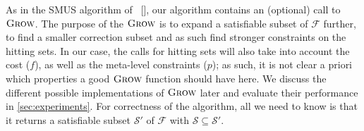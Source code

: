 \documentclass[twoside,11pt]{article}
\newcommand\citet[1]{\citeauthor{#1}~[\citeyear{#1}]}
\newcommand\m[1]{\mathcal{#1}}
\newcommand\comment[1]{\marginpar{\tiny #1}}
\renewcommand\comment[1]{#1}
\newcommand{\tias}[1]{{\comment{\color{blue}Tias:#1}}}
\newcommand{\bart}[1]{{\comment{\color{green}Bart: #1}}}
\newcommand\setstohit{\ensuremath{\m{H} }\xspace}
\newcommand\formula{\ensuremath{\m{F} }\xspace}
\newcommand\mm[1]{\ensuremath{#1}\xspace}
\newcommand\call[1]{\mm{\textsc{#1}}}
\newcommand\grow{\mm{\call{Grow}}}
\begin{document}
As in the SMUS algorithm of \citet{ignatiev2015smallest}, our algorithm contains an (optional) call to \grow. 
The purpose of the \grow is to expand a satisfiable subset of $\m{F}$ further, to find a smaller correction subset and as such find stronger constraints on the hitting sets. 
In our case, the calls for hitting sets will also take into account the cost ($f$), as well as the meta-level constraints ($p$); as such, it is not clear a priori which properties a good \grow function should have here.
We discuss the different possible implementations of \grow later and evaluate their performance in \cref{sec:experiments}. For correctness of the algorithm, all we need to know is that it returns a satisfiable subset $\m{S}'$ of $\m{F}$ with $\m{S}\subseteq\m{S}'$.
%
\end{document}
